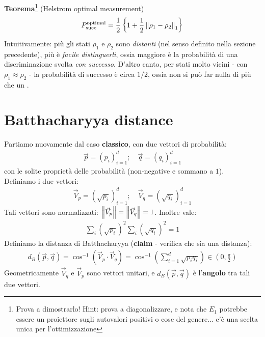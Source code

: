 \documentclass[../../InformazioneQuantistica.tex]{subfiles}
\begin{document}
\textbf{Teorema}\footnote{Prova a dimostrarlo! Hint: prova a diagonalizzare, e nota che $E_1$ potrebbe essere un proiettore sugli autovalori positivi o cose del genere... c'è una scelta unica per l'ottimizzazione} (Helstrom optimal measurement)
\begin{align*}
P_{\mathrm{succ}}^{\mathrm{optimal}} = \frac{1}{2}\left \{ 1+ \frac{1}{2} \left\lVert\rho_1 - \rho_2\right\rVert_1 \right\}
\end{align*}
Intuitivamente: più gli stati $\rho_1$ e $\rho_2$ sono \textit{distanti} (nel senso definito nella sezione precedente), più è \textit{facile distinguerli}, ossia maggiore è la probabilità di una discriminazione svolta \textit{con successo}. D'altro canto, per stati molto vicini - con $\rho_1 \approx \rho_2$ - la probabilità di successo è circa $1/2$, ossia non si può far nulla di più che un .

\section{Batthacharyya distance}
Partiamo nuovamente dal caso \textbf{classico}, con due vettori di probabilità:
\begin{align*}
\vec{p} = (p_i)_{i=1}^d; \quad \vec{q} = (q_i)_{i=1}^d
\end{align*}
con le solite proprietà delle probabilità (non-negative e sommano a $1$).\\
Definiamo i due vettori:
\begin{align*}
\vec{V}_p = (\sqrt{p_i})_{i=1}^d; \quad \vec{V}_q = (\sqrt{q_i})_{i=1}^d
\end{align*}
Tali vettori sono normalizzati: $\left\lVert\vec{V}_p\right\rVert=\left\lVert\vec{V}_q\right\rVert=1$. Inoltre vale:
\begin{align*}
\sum_{i} (\sqrt{p_i})^2 \sum_i (\sqrt{q_i})^2 = 1
\end{align*}
Definiamo la distanza di Batthacharyya (\textbf{claim} - verifica che sia una distanza):
\begin{align*}
d_B(\vec{p},\vec{q}) = \cos^{-1}\left(\vec{V}_p\cdot \vec{V}_q\right) = \cos^{-1}\left( \sum_{i=1}^d \sqrt{p_i q_i} \right) \in \left(0, \frac{\pi}{2}\right)
\end{align*}
Geometricamente $\vec{V}_q$ e $\vec{V}_p$ sono vettori unitari, e $d_B(\vec{p}, \vec{q})$ è l'\textbf{angolo} tra tali due vettori.\\
\end{document}
